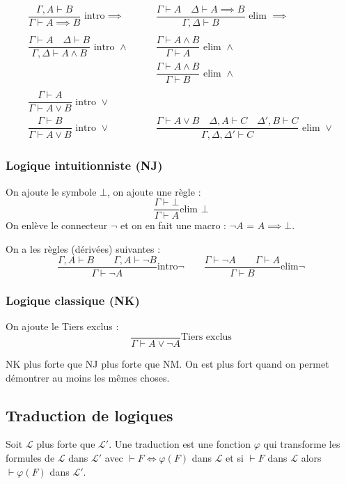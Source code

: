 \documentclass[french]{article}
\begin{document}
\begin{align*}
\dfrac{\Gamma ,A\vdash B}{\Gamma\vdash A\implies B} \text{ intro} \implies &\qquad 
\dfrac{\Gamma\vdash A \quad \Delta\vdash A\implies B}{\Gamma ,\Delta\vdash B} \text{ elim }\implies \\ 
\\
\dfrac{\Gamma\vdash A \quad \Delta \vdash B}{\Gamma, \Delta \vdash A\land B} \text{ intro } \land  &\qquad 
\dfrac{\Gamma\vdash A \land B}{\Gamma \vdash A} \text{ elim }\land \\
&\qquad \dfrac{\Gamma\vdash A \land B}{\Gamma \vdash B} \text{ elim }\land  \\
\\
\dfrac{\Gamma\vdash A}{\Gamma \vdash A \lor B} \text{ intro }\lor &\qquad \\
\dfrac{\Gamma\vdash B}{\Gamma \vdash A \lor B} \text{ intro }\lor 
&\qquad \dfrac{\Gamma\vdash A \lor B \quad \Delta,A \vdash C \quad \Delta',B \vdash C}{\Gamma, \Delta, \Delta' \vdash C} \text{ elim }\lor 
\end{align*}
\subsubsection{Logique intuitionniste (NJ)}
On ajoute le symbole $\bot$, on ajoute une règle :
$$\frac{\Gamma\vdash\bot}{\Gamma\vdash A}\text{elim $\bot$}$$
On enlève le connecteur $\neg$ et on en fait une macro : $\neg A$ = $A\implies\bot$.

On a les règles (dérivées) suivantes :
$$\frac{\Gamma, A\vdash B\qquad \Gamma, A\vdash\neg B}{\Gamma\vdash\neg A}\text{intro}\neg\qquad \frac{\Gamma\vdash\neg A\qquad \Gamma\vdash A}{\Gamma\vdash B}\text{elim}\neg$$

\subsubsection{Logique classique (NK)}
On ajoute le Tiers exclus :
$$\dfrac{}{\Gamma\vdash A\vee\neg A}\text{Tiers exclus}$$

NK plus forte que NJ plus forte que NM. On est plus fort quand on permet démontrer au moins les mêmes choses.
 
\subsection{Traduction de logiques}
Soit $\mathcal{L}$ plus forte que $\mathcal{L}'$. Une traduction est une fonction $\varphi$ qui transforme les formules de $\mathcal{L}$ dans $\mathcal{L}'$ avec $\vdash F \Longleftrightarrow \varphi(F)$ dans $\mathcal{L}$ et si $\vdash F$ dans $\mathcal{L}$ alors $\vdash\varphi (F)$ dans $\mathcal{L}'$. 
\end{document}
